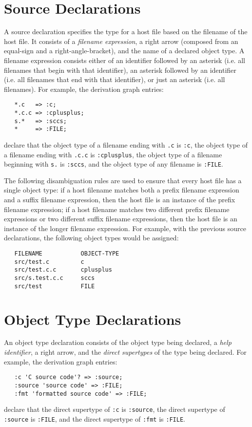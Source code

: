 \documentclass[hidelinks]{report}
\newcommand{\ex}{\tt}   %
\begin{document}
\section{Source Declarations}
\label{sourcedecl}

A source declaration specifies the type for a host file
based on the filename of the host file.
It consists of a {\em filename expression},
a right arrow (composed from an equal-sign and a right-angle-bracket),
and the name of a declared object type.
A filename expression consists either of an identifier followed by an asterisk
(i.e. all filenames that begin with that identifier),
an asterisk followed by an identifier
(i.e. all filenames that end with that identifier),
or just an asterisk (i.e. all filenames).
For example, the derivation graph entries:
\begin{verbatim}
   *.c   => :c;
   *.c.c => :cplusplus;
   s.*   => :sccs;
   *     => :FILE;
\end{verbatim}
declare that the object type of a filename ending with {\ex .c} is {\ex :c},
the object type of a filename ending with {\ex .c.c} is {\ex :cplusplus},
the object type of a filename beginning with {\ex s.} is {\ex :sccs},
and the object type of any filename is {\ex :FILE}.

The following disambiguation rules are used to ensure
that every host file has a single object type:
if a host filename matches both a prefix filename expression
and a suffix filename expression, then the host file is an instance
of the prefix filename expression;
if a host filename matches two different prefix filename expressions
or two different suffix filename expressions,
then the host file is an instance of the longer filename expression.
For example, with the previous source declarations,
the following object types would be assigned:
\begin{verbatim}
   FILENAME           OBJECT-TYPE
   src/test.c         c
   src/test.c.c       cplusplus
   src/s.test.c.c     sccs
   src/test           FILE
\end{verbatim}


\section{Object Type Declarations}
\label{objecttype}

An object type declaration consists of
the object type being declared,
a {\em help identifier},
a right arrow, and the {\em direct supertypes} of the type being declared.
For example, the derivation graph entries:
\begin{verbatim}
   :c 'C source code'? => :source;
   :source 'source code' => :FILE;
   :fmt 'formatted source code' => :FILE;
\end{verbatim}
declare that
the direct supertype of {\ex :c} is {\ex :source},
the direct supertype of {\ex :source} is {\ex :FILE}, and
the direct supertype of {\ex :fmt} is {\ex :FILE}.
\end{document}
